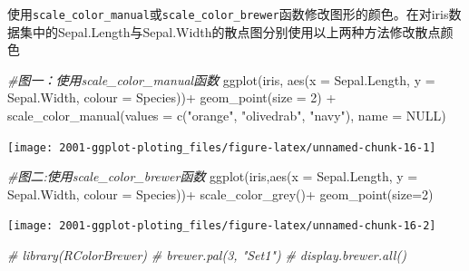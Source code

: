 \documentclass[
]{book}
\newenvironment{Shaded}{\begin{snugshade}}{\end{snugshade}}
\newcommand{\AttributeTok}[1]{\textcolor[rgb]{0.77,0.63,0.00}{#1}}
\newcommand{\CommentTok}[1]{\textcolor[rgb]{0.56,0.35,0.01}{\textit{#1}}}
\newcommand{\ConstantTok}[1]{\textcolor[rgb]{0.00,0.00,0.00}{#1}}
\newcommand{\DecValTok}[1]{\textcolor[rgb]{0.00,0.00,0.81}{#1}}
\newcommand{\FunctionTok}[1]{\textcolor[rgb]{0.00,0.00,0.00}{#1}}
\newcommand{\NormalTok}[1]{#1}
\newcommand{\SpecialCharTok}[1]{\textcolor[rgb]{0.00,0.00,0.00}{#1}}
\newcommand{\StringTok}[1]{\textcolor[rgb]{0.31,0.60,0.02}{#1}}
\begin{document}
使用\texttt{scale\_color\_manual}或\texttt{scale\_color\_brewer}函数修改图形的颜色。在对iris数据集中的Sepal.Length与Sepal.Width的散点图分别使用以上两种方法修改散点颜色

\begin{Shaded}
\begin{Highlighting}[]
\CommentTok{\#图一：使用scale\_color\_manual函数}
\FunctionTok{ggplot}\NormalTok{(iris, }\FunctionTok{aes}\NormalTok{(}\AttributeTok{x =}\NormalTok{ Sepal.Length, }\AttributeTok{y =}\NormalTok{ Sepal.Width, }\AttributeTok{colour =}\NormalTok{ Species))}\SpecialCharTok{+}
  \FunctionTok{geom\_point}\NormalTok{(}\AttributeTok{size =} \DecValTok{2}\NormalTok{) }\SpecialCharTok{+}
  \FunctionTok{scale\_color\_manual}\NormalTok{(}\AttributeTok{values =} \FunctionTok{c}\NormalTok{(}\StringTok{"orange"}\NormalTok{, }\StringTok{"olivedrab"}\NormalTok{, }\StringTok{"navy"}\NormalTok{),}
                     \AttributeTok{name =} \ConstantTok{NULL}\NormalTok{) }
\end{Highlighting}
\end{Shaded}

\begin{center}\texttt{[image: 2001-ggplot-ploting\_files/figure-latex/unnamed-chunk-16-1]} \end{center}

\begin{Shaded}
\begin{Highlighting}[]
\CommentTok{\#图二:使用scale\_color\_brewer函数}
\FunctionTok{ggplot}\NormalTok{(iris,}\FunctionTok{aes}\NormalTok{(}\AttributeTok{x =}\NormalTok{ Sepal.Length, }\AttributeTok{y =}\NormalTok{ Sepal.Width, }\AttributeTok{colour =}\NormalTok{ Species))}\SpecialCharTok{+}
  \FunctionTok{scale\_color\_grey}\NormalTok{()}\SpecialCharTok{+}
  \FunctionTok{geom\_point}\NormalTok{(}\AttributeTok{size=}\DecValTok{2}\NormalTok{) }
\end{Highlighting}
\end{Shaded}

\begin{center}\texttt{[image: 2001-ggplot-ploting\_files/figure-latex/unnamed-chunk-16-2]} \end{center}

\begin{Shaded}
\begin{Highlighting}[]
\CommentTok{\# library(RColorBrewer)}
\CommentTok{\# brewer.pal(3, "Set1")}
\CommentTok{\# display.brewer.all()}
\end{Highlighting}
\end{Shaded}
\end{document}
